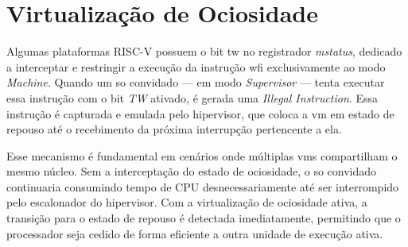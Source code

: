 \section{Virtualização de Ociosidade}

Algumas plataformas RISC-V possuem o bit \gls{tw} no registrador \textit{mstatus}, dedicado a interceptar e restringir a execução da instrução \gls{wfi} exclusivamente ao modo \textit{Machine}.
Quando um \gls{so} convidado — em modo \textit{Supervisor} — tenta executar essa instrução com o bit \textit{TW} ativado, é gerada uma \textit{Illegal Instruction}.
Essa instrução é capturada e emulada pelo hipervisor, que coloca a \gls{vm} em estado de repouso até o recebimento da próxima interrupção pertencente a ela.

Esse mecanismo é fundamental em cenários onde múltiplas \glspl{vm} compartilham o mesmo núcleo. Sem a interceptação do estado de ociosidade, o \gls{so} convidado continuaria consumindo tempo de 
CPU desnecessariamente até ser interrompido pelo escalonador do hipervisor. Com a virtualização de ociosidade ativa, a transição para o estado de repouso é detectada imediatamente,
permitindo que o processador seja cedido de forma eficiente a outra unidade de execução ativa.
